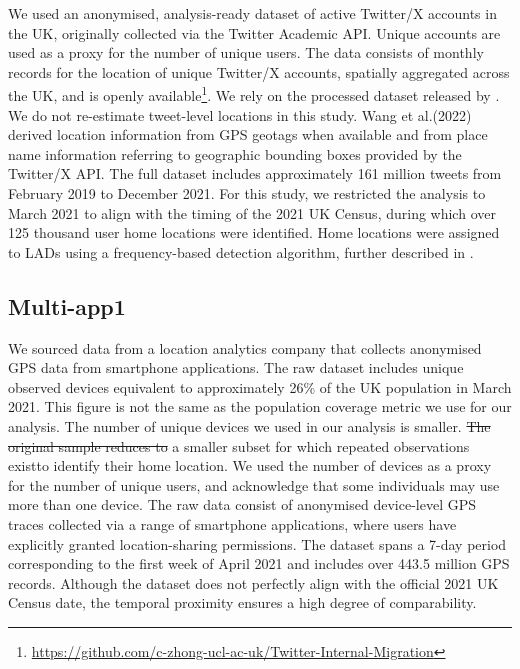 \documentclass[]{rsos}%
\providecommand{\DIFadd}[1]{{\protect\color{blue}\uwave{#1}}} %
\providecommand{\DIFdel}[1]{{\protect\color{red}\sout{#1}}}                      %
\providecommand{\DIFaddbegin}{} %
\providecommand{\DIFaddend}{} %
\providecommand{\DIFdelbegin}{} %
\providecommand{\DIFdelend}{} %
\begin{document}
We used an anonymised, analysis-ready dataset of active Twitter/X
accounts in the UK, originally collected via the Twitter Academic API.
Unique accounts are used as a proxy for the number of unique users. The
data consists of monthly records for the location of unique Twitter/X
accounts, spatially aggregated across the UK, and is openly
available\footnote{\url{https://github.com/c-zhong-ucl-ac-uk/Twitter-Internal-Migration}}. We rely on the processed dataset released by \citep{wang2022}.
We do not re-estimate tweet-level locations in this study. Wang et
al.(2022) derived location information from GPS geotags when available
and from place name information referring to geographic bounding boxes
provided by the Twitter/X API. The full dataset includes approximately
161 million tweets from February 2019 to December 2021. For this study,
we restricted the analysis to March 2021 to align with the timing of the
2021 UK Census, during which over 125 thousand user home locations were
identified. Home locations were assigned to LADs using a frequency-based
detection algorithm, further described in \citep{wang2022}.

\subsection{Multi-app1}\label{multi-app1}

We sourced data from a location analytics company that collects
anonymised GPS data from smartphone applications. The raw dataset
includes unique observed devices equivalent to approximately 26\% of the
UK population in March 2021. This figure is not the same as the
population coverage metric we use for our analysis. The number of unique
devices we used in our analysis is smaller. \DIFdelbegin \DIFdel{The original sample reduces
to }\DIFdelend \DIFaddbegin \DIFadd{We consider }\DIFaddend a smaller subset \DIFaddbegin \DIFadd{from the original sample }\DIFaddend for which repeated observations exist\DIFaddbegin \DIFadd{, allowing us }\DIFaddend to identify their home location. We used the number of devices as a proxy for the
number of unique users, and acknowledge that some individuals may use
more than one device. The raw data consist of anonymised device-level
GPS traces collected via a range of smartphone applications, where users
have explicitly granted location-sharing permissions. The dataset spans
a 7-day period corresponding to the first week of April 2021 and
includes over 443.5 million GPS records. Although the dataset does not
perfectly align with the official 2021 UK Census date, the temporal
proximity ensures a high degree of comparability.
\end{document}
